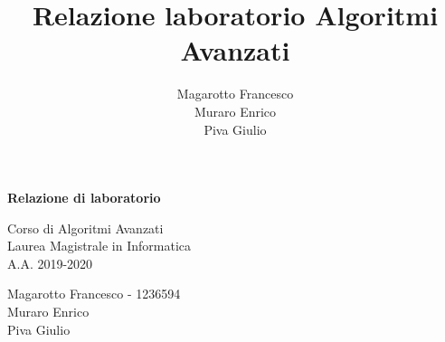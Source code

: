 \documentclass[a4paper]{article}
\title{Relazione laboratorio Algoritmi Avanzati}
\author{Magarotto Francesco\\Muraro Enrico\\Piva Giulio}
\begin{document}
\begin{titlepage}
  \vspace*{5cm}
  \begin{center}
    \Large\bfseries
	Relazione di laboratorio
  \end{center}
  \begin{center}
  \large
  Corso di Algoritmi Avanzati\\
  Laurea Magistrale in Informatica\\A.A. 2019-2020
  \end{center}
  \vspace{4cm plus 1fill}
  \begin{flushleft}
  \large
    Magarotto Francesco - 1236594\\Muraro Enrico\\Piva Giulio
  \end{flushleft}
\end{titlepage}
\newpage



\newpage

\end{document}

